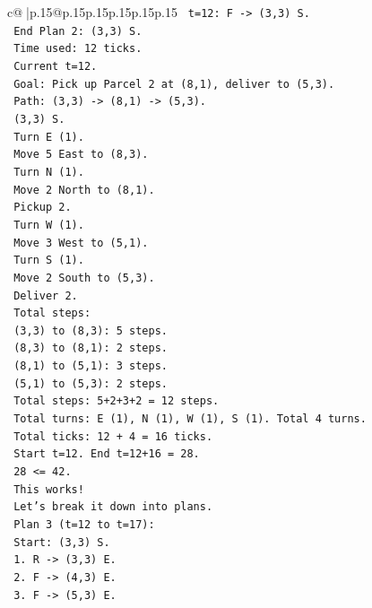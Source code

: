 \documentclass{article}
\begin{document}
{\begin{supertabular}{c@{$\;$}|p{.15\linewidth}@{}p{.15\linewidth}p{.15\linewidth}p{.15\linewidth}p{.15\linewidth}p{.15\linewidth}}
{{{\texttt{   t=12: F {-}> (3,3) S.} \\
\texttt{   End Plan 2: (3,3) S.} \\
\texttt{   Time used: 12 ticks.} \\
\texttt{   Current t=12.} \\
\texttt{   Goal: Pick up Parcel 2 at (8,1), deliver to (5,3).} \\
\texttt{   Path: (3,3) {-}> (8,1) {-}> (5,3).} \\
\texttt{   (3,3) S.} \\
\texttt{   Turn E (1).} \\
\texttt{   Move 5 East to (8,3).} \\
\texttt{   Turn N (1).} \\
\texttt{   Move 2 North to (8,1).} \\
\texttt{   Pickup 2.} \\
\texttt{   Turn W (1).} \\
\texttt{   Move 3 West to (5,1).} \\
\texttt{   Turn S (1).} \\
\texttt{   Move 2 South to (5,3).} \\
\texttt{   Deliver 2.} \\
\texttt{   Total steps:} \\
\texttt{   (3,3) to (8,3): 5 steps.} \\
\texttt{   (8,3) to (8,1): 2 steps.} \\
\texttt{   (8,1) to (5,1): 3 steps.} \\
\texttt{   (5,1) to (5,3): 2 steps.} \\
\texttt{   Total steps: 5+2+3+2 = 12 steps.} \\
\texttt{   Total turns: E (1), N (1), W (1), S (1). Total 4 turns.} \\
\texttt{   Total ticks: 12 + 4 = 16 ticks.} \\
\texttt{   Start t=12. End t=12+16 = 28.} \\
\texttt{   28 <= 42.} \\
\texttt{   This works!} \\
\texttt{   Let's break it down into plans.} \\
\texttt{   Plan 3 (t=12 to t=17):} \\
\texttt{   Start: (3,3) S.} \\
\texttt{   1. R {-}> (3,3) E.} \\
\texttt{   2. F {-}> (4,3) E.} \\
\texttt{   3. F {-}> (5,3) E.} \\
}}}
\end{supertabular}}
\end{document}
